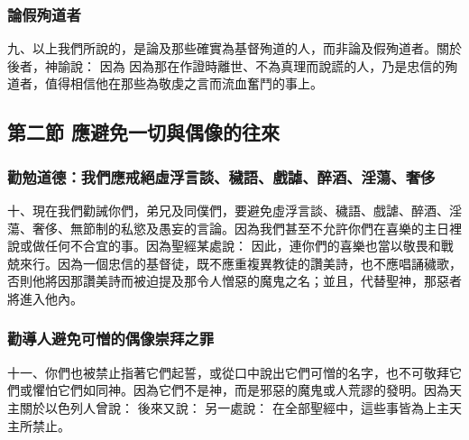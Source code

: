 
\subsubsection{論假殉道者}

九、以上我們所說的，是論及那些確實為基督殉道的人，而非論及假殉道者。關於後者，神諭說：  因為  因為那在作證時離世、不為真理而說謊的人，乃是忠信的殉道者，值得相信他在那些為敬虔之言而流血奮鬥的事上。\par


\subsection{第二節 應避免一切與偶像的往來}


\subsubsection{勸勉道德：我們應戒絕虛浮言談、穢語、戲謔、醉酒、淫蕩、奢侈}

十、現在我們勸誡你們，弟兄及同僕們，要避免虛浮言談、穢語、戲謔、醉酒、淫蕩、奢侈、無節制的私慾及愚妄的言論。因為我們甚至不允許你們在喜樂的主日裡說或做任何不合宜的事。因為聖經某處說： 因此，連你們的喜樂也當以敬畏和戰兢來行。因為一個忠信的基督徒，既不應重複異教徒的讚美詩，也不應唱誦穢歌，否則他將因那讚美詩而被迫提及那令人憎惡的魔鬼之名；並且，代替聖神，那惡者將進入他內。\par


\subsubsection{勸導人避免可憎的偶像崇拜之罪}

十一、你們也被禁止指著它們起誓，或從口中說出它們可憎的名字，也不可敬拜它們或懼怕它們如同神。因為它們不是神，而是邪惡的魔鬼或人荒謬的發明。因為天主關於以色列人曾說：  後來又說：  另一處說： 在全部聖經中，這些事皆為上主天主所禁止。\par

